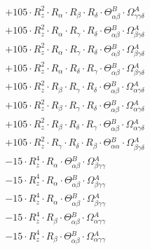\documentclass{article}
\begin{document}
\begin{subequations}
\begin{gather}
\begin{array}{c}
 \\[0.2em] 		 + 105 \cdot R_{z}^{2} \cdot R_{\alpha{}} \cdot R_{\beta{}} \cdot R_{\delta{}} \cdot \Theta{}^{B}_{\alpha{}\beta{}} \cdot \Omega{}^{A}_{\gamma{}\gamma{}\delta{}} 
 \\[0.2em] 		 + 105 \cdot R_{z}^{2} \cdot R_{\alpha{}} \cdot R_{\gamma{}} \cdot R_{\delta{}} \cdot \Theta{}^{B}_{\alpha{}\beta{}} \cdot \Omega{}^{A}_{\beta{}\gamma{}\delta{}} 
 \\[0.2em] 		 + 105 \cdot R_{z}^{2} \cdot R_{\alpha{}} \cdot R_{\gamma{}} \cdot R_{\delta{}} \cdot \Theta{}^{B}_{\alpha{}\beta{}} \cdot \Omega{}^{A}_{\beta{}\gamma{}\delta{}} 
 \\[0.2em] 		 + 105 \cdot R_{z}^{2} \cdot R_{\alpha{}} \cdot R_{\delta{}} \cdot R_{\gamma{}} \cdot \Theta{}^{B}_{\alpha{}\beta{}} \cdot \Omega{}^{A}_{\beta{}\gamma{}\delta{}} 
 \\[0.2em] 		 + 105 \cdot R_{z}^{2} \cdot R_{\beta{}} \cdot R_{\gamma{}} \cdot R_{\delta{}} \cdot \Theta{}^{B}_{\alpha{}\beta{}} \cdot \Omega{}^{A}_{\alpha{}\gamma{}\delta{}} 
 \\[0.2em] 		 + 105 \cdot R_{z}^{2} \cdot R_{\beta{}} \cdot R_{\gamma{}} \cdot R_{\delta{}} \cdot \Theta{}^{B}_{\alpha{}\beta{}} \cdot \Omega{}^{A}_{\alpha{}\gamma{}\delta{}} 
 \\[0.2em] 		 + 105 \cdot R_{z}^{2} \cdot R_{\beta{}} \cdot R_{\delta{}} \cdot R_{\gamma{}} \cdot \Theta{}^{B}_{\alpha{}\beta{}} \cdot \Omega{}^{A}_{\alpha{}\gamma{}\delta{}} 
 \\[0.2em] 		 + 105 \cdot R_{z}^{2} \cdot R_{\gamma{}} \cdot R_{\delta{}} \cdot R_{\beta{}} \cdot \Theta{}^{B}_{\alpha{}\alpha{}} \cdot \Omega{}^{A}_{\beta{}\gamma{}\delta{}} 
 \\[0.2em] 		 - 15 \cdot R_{z}^{4} \cdot R_{\alpha{}} \cdot \Theta{}^{B}_{\alpha{}\beta{}} \cdot \Omega{}^{A}_{\beta{}\gamma{}\gamma{}} 
 \\[0.2em] 		 - 15 \cdot R_{z}^{4} \cdot R_{\alpha{}} \cdot \Theta{}^{B}_{\alpha{}\beta{}} \cdot \Omega{}^{A}_{\beta{}\gamma{}\gamma{}} 
 \\[0.2em] 		 - 15 \cdot R_{z}^{4} \cdot R_{\alpha{}} \cdot \Theta{}^{B}_{\alpha{}\beta{}} \cdot \Omega{}^{A}_{\beta{}\gamma{}\gamma{}} 
 \\[0.2em] 		 - 15 \cdot R_{z}^{4} \cdot R_{\beta{}} \cdot \Theta{}^{B}_{\alpha{}\beta{}} \cdot \Omega{}^{A}_{\alpha{}\gamma{}\gamma{}} 
 \\[0.2em] 		 - 15 \cdot R_{z}^{4} \cdot R_{\beta{}} \cdot \Theta{}^{B}_{\alpha{}\beta{}} \cdot \Omega{}^{A}_{\alpha{}\gamma{}\gamma{}} 

\end{array}
\end{gather}
\end{subequations}
\end{document}
